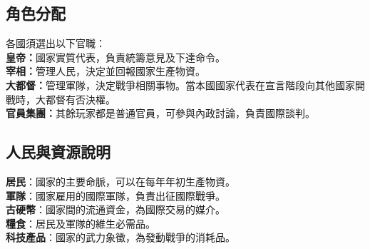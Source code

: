 \subsection{角色分配}
\noindent
各國須選出以下官職：\\
\textbf{皇帝：}國家實質代表，負責統籌意見及下達命令。\\
\textbf{宰相：}管理人民，決定並回報國家生產物資。\\
\textbf{大都督：}管理軍隊，決定戰爭相關事物。當本國國家代表在宣言階段向其他國家開戰時，大都督有否決權。\\
\textbf{官員集團：}其餘玩家都是普通官員，可參與內政討論，負責國際談判。
\subsection{人民與資源說明}
\noindent
\textbf{居民}：國家的主要命脈，可以在每年年初生產物資。\\
\textbf{軍隊}：國家雇用的國際軍隊，負責出征國際戰爭。\\
\textbf{古硬幣}：國家間的流通資金，為國際交易的媒介。\\
\textbf{糧食}：居民及軍隊的維生必需品。\\
\textbf{科技產品}：國家的武力象徵，為發動戰爭的消耗品。\\

